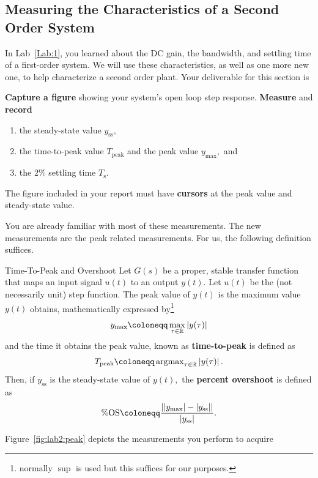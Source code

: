 \subsection{Measuring the Characteristics of a Second Order System}
In Lab~\ref{Lab:1}, you learned about the DC gain, the bandwidth, and
settling time of a first-order system.
We will use these characteristics, as well as one more new one, to help
characterize a second order plant.
%
Your deliverable for this section is
%
\begin{deliverable}[label={lab2:d1}]
  \textbf{Capture a figure} showing your system's open loop step response.
  \textbf{Measure} and \textbf{record}
  \begin{enumerate}[label=(\arabic*)]
    \item{the steady-state value \(y_{\mathrm{ss}},\)}
    \item{
      the time-to-peak value \(T_{\mathrm{peak}}\) and
      the peak value \(y_{\mathrm{max}},\) and
    }
    \item{
      the \(2\%\) settling time \(T_{\mathrm{s}}.\)
    }
  \end{enumerate}
  The figure included in your report must have \textbf{cursors} at the peak
  value and steady-state value.
\end{deliverable}
%
You are already familiar with most of these measurements. The new measurements
are the peak related measurements. For us, the following definition suffices.
%
\begin{definition}[]{Time-To-Peak and Overshoot}
  Let \(G(s)\) be a proper, stable transfer function
  that maps an input signal \(u(t)\) to an output \(y(t).\)
%
  Let \(u(t)\) be the (not necessarily unit) step function. The peak value
  of \(y(t)\) is the maximum value \(y(t)\) obtains, mathematically expressed
  by\footnote{normally \(\sup\) is used but this suffices for our purposes.}
  \[
    y_\mathrm{max} \defineas \max_{\tau \in \Real} \left| y(\tau) \right|
  \]
  and the time it obtains the peak value, known as \textbf{time-to-peak}
  is defined as
  \[
    T_\mathrm{peak} \defineas \argmax_{\tau \in \Real} \left| y(\tau) \right|.
  \]
  Then, if \(y_\mathrm{ss}\) is the steady-state value of \(y(t),\) the
  \textbf{percent overshoot} is defined as
  \[
    \%\mathrm{OS}
      \defineas
        \frac{%
          \left|
            \left|y_\mathrm{max}\right| - \left|y_\mathrm{ss}\right|
          \right|%
        }{%
          \left| y_\mathrm{ss}\right|%
        }.
  \]
\end{definition}
%
Figure~\ref{fig:lab2:peak} depicts the measurements you perform to acquire
